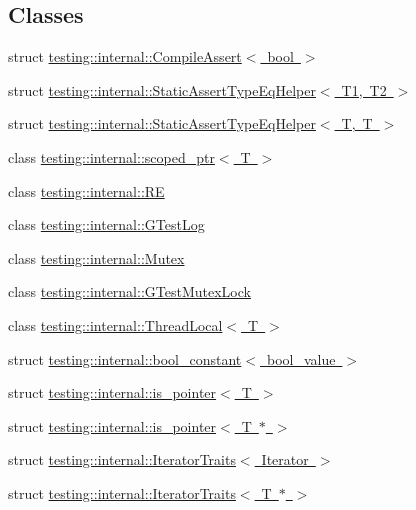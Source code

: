 \subsection*{Classes}
\begin{DoxyCompactItemize}
\item 
struct \mbox{\hyperlink{structtesting_1_1internal_1_1_compile_assert}{testing\+::internal\+::\+Compile\+Assert$<$ bool $>$}}
\item 
struct \mbox{\hyperlink{structtesting_1_1internal_1_1_static_assert_type_eq_helper}{testing\+::internal\+::\+Static\+Assert\+Type\+Eq\+Helper$<$ T1, T2 $>$}}
\item 
struct \mbox{\hyperlink{structtesting_1_1internal_1_1_static_assert_type_eq_helper_3_01_t_00_01_t_01_4}{testing\+::internal\+::\+Static\+Assert\+Type\+Eq\+Helper$<$ T, T $>$}}
\item 
class \mbox{\hyperlink{classtesting_1_1internal_1_1scoped__ptr}{testing\+::internal\+::scoped\+\_\+ptr$<$ T $>$}}
\item 
class \mbox{\hyperlink{classtesting_1_1internal_1_1_r_e}{testing\+::internal\+::\+RE}}
\item 
class \mbox{\hyperlink{classtesting_1_1internal_1_1_g_test_log}{testing\+::internal\+::\+G\+Test\+Log}}
\item 
class \mbox{\hyperlink{classtesting_1_1internal_1_1_mutex}{testing\+::internal\+::\+Mutex}}
\item 
class \mbox{\hyperlink{classtesting_1_1internal_1_1_g_test_mutex_lock}{testing\+::internal\+::\+G\+Test\+Mutex\+Lock}}
\item 
class \mbox{\hyperlink{classtesting_1_1internal_1_1_thread_local}{testing\+::internal\+::\+Thread\+Local$<$ T $>$}}
\item 
struct \mbox{\hyperlink{structtesting_1_1internal_1_1bool__constant}{testing\+::internal\+::bool\+\_\+constant$<$ bool\+\_\+value $>$}}
\item 
struct \mbox{\hyperlink{structtesting_1_1internal_1_1is__pointer}{testing\+::internal\+::is\+\_\+pointer$<$ T $>$}}
\item 
struct \mbox{\hyperlink{structtesting_1_1internal_1_1is__pointer_3_01_t_01_5_01_4}{testing\+::internal\+::is\+\_\+pointer$<$ T $\ast$ $>$}}
\item 
struct \mbox{\hyperlink{structtesting_1_1internal_1_1_iterator_traits}{testing\+::internal\+::\+Iterator\+Traits$<$ Iterator $>$}}
\item 
struct \mbox{\hyperlink{structtesting_1_1internal_1_1_iterator_traits_3_01_t_01_5_01_4}{testing\+::internal\+::\+Iterator\+Traits$<$ T $\ast$ $>$}}

\end{DoxyCompactItemize}
